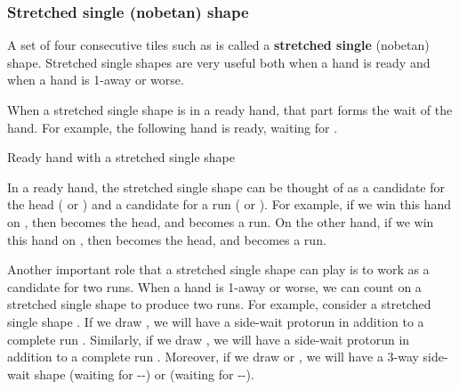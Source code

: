 \subsubsection{Stretched single ({\jap nobetan}) shape} \label{sec:nobetan}
A set of four consecutive tiles such as {\LARGE{}} is called a {\bf stretched single} ({\jap nobetan}) shape. Stretched single shapes are very useful both when a hand is ready and when a hand is 1-away or worse. 

\bigskip
When a stretched single shape is in a ready hand, that part forms the wait of the hand. For example, the following hand is ready, waiting for {\LARGE{} }.
\bigskip
\begin{itembox}[r]{Ready hand with a stretched single shape}
\bp
{}\zhong\zhong\zhong
\ep 
\end{itembox}
In a ready hand, the stretched single shape can be thought of as a candidate for the head ({\LARGE{}} or {\LARGE{}}) and a candidate for a run ({\LARGE{}} or {\LARGE{}}). For example, if we win this hand on {\LARGE{}}, then {\LARGE{}} becomes the head, and {\LARGE{}} becomes a run. On the other hand, if we win this hand on {\LARGE{}}, then {\LARGE{}} becomes the head, and {\LARGE{}} becomes a run. 

\bigskip

Another important role that a stretched single shape can play is to work as a candidate for two runs. When a hand is 1-away or worse, we can count on a stretched single shape to produce two runs. 
For example, consider a stretched single shape {\LARGE{}}. 
If we draw {\LARGE{}}, we will have a side-wait protorun {\LARGE{}} in addition to a complete run {\LARGE{}}. Similarly, if we draw {\LARGE{}}, we will have a side-wait protorun {\LARGE{}} in addition to a complete run {\LARGE{}}. Moreover, if we draw {\LARGE{}} or {\LARGE{}}, we will have a 3-way side-wait shape {\LARGE{}} (waiting for {\LARGE{}--}) or {\LARGE{}} (waiting for {\LARGE{}--}). 

